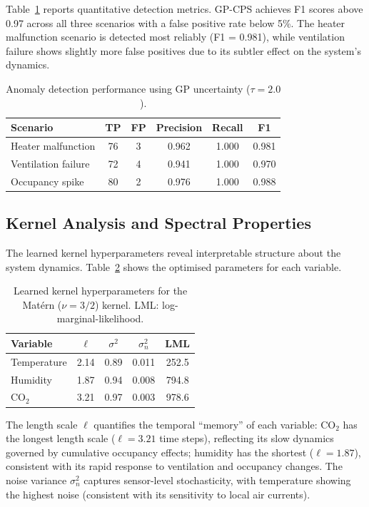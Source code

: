 \documentclass[conference]{IEEEtran}
\begin{document}
Table~\ref{tab:anomaly_metrics} reports quantitative detection metrics. GP-CPS achieves F1 scores above 0.97 across all three scenarios with a false positive rate below 5\%. The heater malfunction scenario is detected most reliably (F1 = 0.981), while ventilation failure shows slightly more false positives due to its subtler effect on the system's dynamics.

\begin{table}[t]
\centering
\caption{Anomaly detection performance using GP uncertainty ($\tau = 2.0$).}
\label{tab:anomaly_metrics}
\small
\begin{tabular}{lccccc}
\toprule
\textbf{Scenario} & \textbf{TP} & \textbf{FP} & \textbf{Precision} & \textbf{Recall} & \textbf{F1} \\
\midrule
Heater malfunction & 76 & 3 & 0.962 & 1.000 & 0.981 \\
Ventilation failure & 72 & 4 & 0.941 & 1.000 & 0.970 \\
Occupancy spike & 80 & 2 & 0.976 & 1.000 & 0.988 \\
\bottomrule
\end{tabular}
\end{table}

\subsection{Kernel Analysis and Spectral Properties}

The learned kernel hyperparameters reveal interpretable structure about the system dynamics. Table~\ref{tab:kernels} shows the optimised parameters for each variable.

\begin{table}[t]
\centering
\caption{Learned kernel hyperparameters for the Mat\'ern ($\nu=3/2$) kernel. LML: log-marginal-likelihood.}
\label{tab:kernels}
\small
\begin{tabular}{lcccc}
\toprule
\textbf{Variable} & $\ell$ & $\sigma^2$ & $\sigma_n^2$ & LML \\
\midrule
Temperature & 2.14 & 0.89 & 0.011 & 252.5 \\
Humidity & 1.87 & 0.94 & 0.008 & 794.8 \\
CO$_2$ & 3.21 & 0.97 & 0.003 & 978.6 \\
\bottomrule
\end{tabular}
\end{table}

The length scale $\ell$ quantifies the temporal ``memory'' of each variable: CO$_2$ has the longest length scale ($\ell = 3.21$ time steps), reflecting its slow dynamics governed by cumulative occupancy effects; humidity has the shortest ($\ell = 1.87$), consistent with its rapid response to ventilation and occupancy changes. The noise variance $\sigma_n^2$ captures sensor-level stochasticity, with temperature showing the highest noise (consistent with its sensitivity to local air currents).
\end{document}
